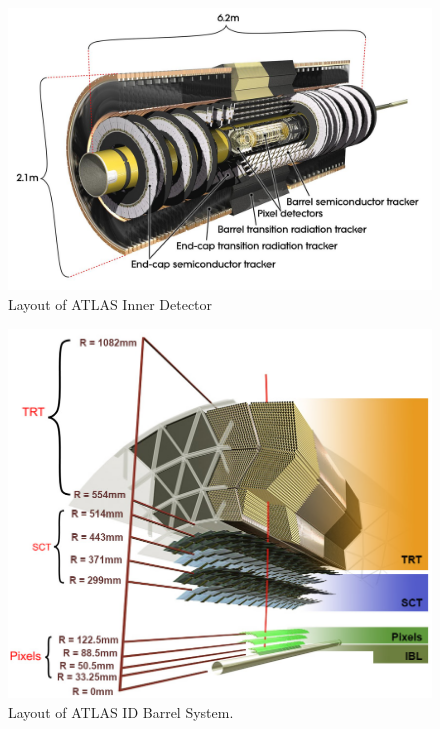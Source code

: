 \begin{figure}[h!]
  \centering
  \includegraphics[width=\hsize]{figures/Detector/tracker_layout.jpg}
  \caption{Layout of ATLAS Inner Detector} 
  \label{fig:ID}
\end{figure}
\FloatBarrier


\begin{figure}[h!]
  \centering
  \includegraphics[width=\hsize]{figures/Detector/tracker_barrel.png}
  \caption{Layout of ATLAS ID Barrel System.} 
  \label{fig:barrelID}
\end{figure}
\FloatBarrier


